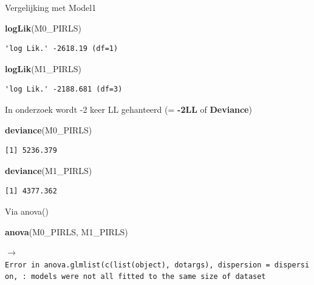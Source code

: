 \documentclass[
  10pt,
  ignorenonframetext,
]{beamer}
\newenvironment{Shaded}{\begin{snugshade}}{\end{snugshade}}
\newcommand{\KeywordTok}[1]{\textcolor[rgb]{0.13,0.29,0.53}{\textbf{#1}}}
\newcommand{\NormalTok}[1]{#1}
\begin{document}
\begin{frame}[fragile]{Vergelijking met Model1}
\protect\hypertarget{vergelijking-met-model1}{}

\tiny

\begin{Shaded}
\begin{Highlighting}[]
\KeywordTok{logLik}\NormalTok{(M0_PIRLS)}
\end{Highlighting}
\end{Shaded}

\begin{verbatim}
'log Lik.' -2618.19 (df=1)
\end{verbatim}

\begin{Shaded}
\begin{Highlighting}[]
\KeywordTok{logLik}\NormalTok{(M1_PIRLS)}
\end{Highlighting}
\end{Shaded}

\begin{verbatim}
'log Lik.' -2188.681 (df=3)
\end{verbatim}

\normalsize \bigskip     In onderzoek wordt -2 keer LL gehanteerd (=
\textbf{-2LL} of \textbf{Deviance})

\tiny

\begin{Shaded}
\begin{Highlighting}[]
\KeywordTok{deviance}\NormalTok{(M0_PIRLS)}
\end{Highlighting}
\end{Shaded}

\begin{verbatim}
[1] 5236.379
\end{verbatim}

\begin{Shaded}
\begin{Highlighting}[]
\KeywordTok{deviance}\NormalTok{(M1_PIRLS)}
\end{Highlighting}
\end{Shaded}

\begin{verbatim}
[1] 4377.362
\end{verbatim}

\normalsize

\end{frame}

\begin{frame}[fragile]{Via anova()}
\protect\hypertarget{via-anova}{}

\tiny

\begin{Shaded}
\begin{Highlighting}[]
\KeywordTok{anova}\NormalTok{(M0_PIRLS, M1_PIRLS)}
\end{Highlighting}
\end{Shaded}

\normalsize

\(\rightarrow\)
\texttt{Error\ in\ anova.glmlist(c(list(object),\ dotargs),\ dispersion\ =\ dispersion,\ :\ models\ were\ not\ all\ fitted\ to\ the\ same\ size\ of\ dataset}

\end{frame}
\end{document}
